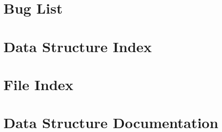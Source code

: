 \documentclass[twoside]{book}
\newcommand{\+}{\discretionary{\mbox{\scriptsize$\hookleftarrow$}}{}{}}
\begin{document}
\chapter{Bug List}
\label{bug}
\hypertarget{bug}{}

\chapter{Data Structure Index}

\chapter{File Index}

\chapter{Data Structure Documentation}







































\end{document}
